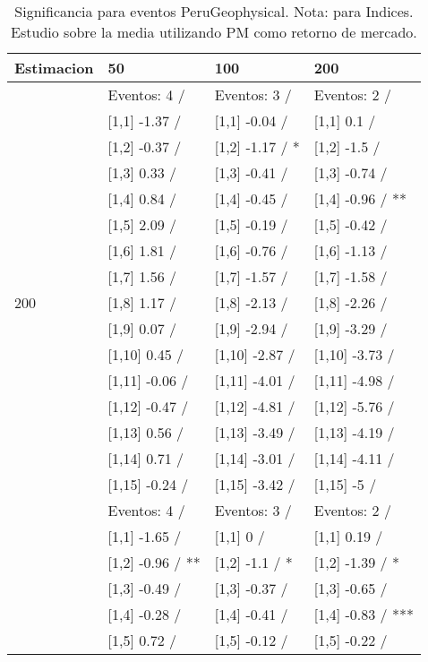 \begin{table}

\caption{Significancia para eventos PeruGeophysical. Nota: para Indices. Estudio sobre la media utilizando PM como retorno de mercado.}
\centering
\begin{tabular}[t]{llll}
\toprule
Estimacion & 50 & 100 & 200\\
\midrule
 & Eventos:  4 / & Eventos:  3 / & Eventos:  2 /\\
 & {}[1,1] -1.37  / & {}[1,1] -0.04  / & {}[1,1] 0.1  /\\
 & {}[1,2] -0.37  / & {}[1,2] -1.17  / * & {}[1,2] -1.5  /\\
 & {}[1,3] 0.33  / & {}[1,3] -0.41  / & {}[1,3] -0.74  /\\
 & {}[1,4] 0.84  / & {}[1,4] -0.45  / & {}[1,4] -0.96  / **\\
\addlinespace
 & {}[1,5] 2.09  / & {}[1,5] -0.19  / & {}[1,5] -0.42  /\\
 & {}[1,6] 1.81  / & {}[1,6] -0.76  / & {}[1,6] -1.13  /\\
 & {}[1,7] 1.56  / & {}[1,7] -1.57  / & {}[1,7] -1.58  /\\
200 & {}[1,8] 1.17  / & {}[1,8] -2.13  / & {}[1,8] -2.26  /\\
 & {}[1,9] 0.07  / & {}[1,9] -2.94  / & {}[1,9] -3.29  /\\
\addlinespace
 & {}[1,10] 0.45  / & {}[1,10] -2.87  / & {}[1,10] -3.73  /\\
 & {}[1,11] -0.06  / & {}[1,11] -4.01  / & {}[1,11] -4.98  /\\
 & {}[1,12] -0.47  / & {}[1,12] -4.81  / & {}[1,12] -5.76  /\\
 & {}[1,13] 0.56  / & {}[1,13] -3.49  / & {}[1,13] -4.19  /\\
 & {}[1,14] 0.71  / & {}[1,14] -3.01  / & {}[1,14] -4.11  /\\
\addlinespace
 & {}[1,15] -0.24  / & {}[1,15] -3.42  / & {}[1,15] -5  /\\
 & Eventos:  4 / & Eventos:  3 / & Eventos:  2 /\\
 & {}[1,1] -1.65  / & {}[1,1] 0  / & {}[1,1] 0.19  /\\
 & {}[1,2] -0.96  / ** & {}[1,2] -1.1  / * & {}[1,2] -1.39  / *\\
 & {}[1,3] -0.49  / & {}[1,3] -0.37  / & {}[1,3] -0.65  /\\
\addlinespace
 & {}[1,4] -0.28  / & {}[1,4] -0.41  / & {}[1,4] -0.83  / ***\\
 & {}[1,5] 0.72  / & {}[1,5] -0.12  / & {}[1,5] -0.22  /\\

\end{tabular}
\end{table}
